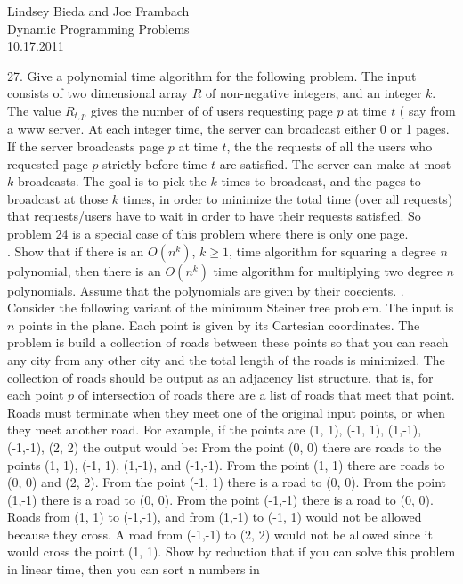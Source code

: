 \documentclass[10pt]{article}
\begin{document}
	\begin{flushright}
	Lindsey Bieda and Joe Frambach\\
	Dynamic Programming Problems\\
	10.17.2011
	\end{flushright}
	27.	Give a polynomial time algorithm for the following problem. The input consists of two dimensional
array $R$ of non-negative integers, and an integer $k$. The value $R_{t,p}$ gives the number of of users
requesting page $p$ at time $t$ ( say from a www server. At each integer time, the server can broadcast
either 0 or 1 pages. If the server broadcasts page $p$ at time $t$, the the requests of all the users who
requested page $p$ strictly before time $t$ are satisfied. The server can make at most $k$ broadcasts. The
goal is to pick the $k$ times to broadcast, and the pages to broadcast at those $k$ times, in order to
minimize the total time (over all requests) that requests/users have to wait in order to have their
requests satisfied. So problem 24 is a special case of this problem where there is only one page.\\
. Show that if there is an $O(n^k)$, $k \geq 1$, time algorithm for squaring a degree $n$ polynomial,
then there is an $O(n^k)$ time algorithm for multiplying two degree $n$ polynomials. Assume that the polynomials
are given by their coecients.
. Consider the following variant of the minimum Steiner tree problem. The input is $n$ points in the plane.
Each point is given by its Cartesian coordinates. The problem is build a collection of roads between
these points so that you can reach any city from any other city and the total length of the roads is
minimized. The collection of roads should be output as an adjacency list structure, that is, for each
point $p$ of intersection of roads there are a list of roads that meet that point. Roads must terminate
when they meet one of the original input points, or when they meet another road. For example, if the
points are (1, 1), (-1, 1), (1,-1), (-1,-1), (2, 2) the output would be:
From the point (0, 0) there are roads to the points (1, 1), (-1, 1), (1,-1), and (-1,-1). From the point
(1, 1) there are roads to (0, 0) and (2, 2). From the point (-1, 1) there is a road to (0, 0). From the
point (1,-1) there is a road to (0, 0). From the point (-1,-1) there is a road to (0, 0).
Roads from (1, 1) to (-1,-1), and from (1,-1) to (-1, 1) would not be allowed because they cross. A
road from (-1,-1) to (2, 2) would not be allowed since it would cross the point (1, 1).
Show by reduction that if you can solve this problem in linear time, then you can sort n numbers in
\end{document}
